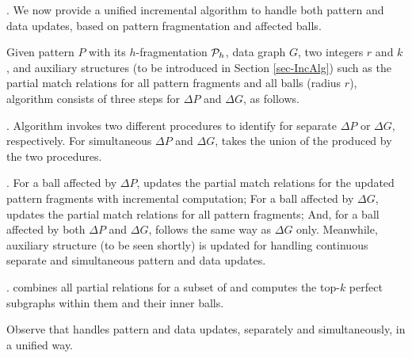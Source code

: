 . We now provide a unified incremental algorithm to handle both pattern and data updates,
based on pattern fragmentation and affected balls.


Given pattern $P$ with its $h$-fragmentation ${\cal P}_{h}$, data graph $G$, two integers $r$ and $k$,
and auxiliary structures (to be introduced in Section \ref{sec-IncAlg}) such as the partial match relations for all pattern fragments and all balls (radius $r$),
algorithm \inc  consists of three steps for $\Delta P$ and $\Delta G$, as follows.


.
Algorithm \inc invokes two different procedures to identify \affballsx for separate $\Delta P$ or $\Delta G$, respectively.
For  simultaneous $\Delta P$ and $\Delta G$, \inc takes the union of the \affballsx produced by  the two procedures.


.
For a ball affected by $\Delta P$, \inc updates the partial match relations for the updated pattern fragments with incremental computation;
For a ball affected by $\Delta G$, \inc updates the partial match relations for all pattern fragments;
And, for a ball affected by both $\Delta P$ and $\Delta G$, \inc follows the same way as $\Delta G$ only.
Meanwhile, auxiliary structure \fb (to be seen shortly) is updated for handling continuous separate and simultaneous pattern and data updates.


. \inc combines all partial relations for a subset of \affballsx and computes the top-$k$ perfect subgraphs within them and their inner balls.


Observe that \inc handles pattern and data updates, separately and simultaneously, in a unified way.



